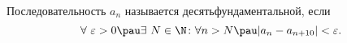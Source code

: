 Последовательность $a_n$ называется десятьфундаментальной, если 
\[\forall\ \varepsilon>0\pau\exists\ 
N\in \N\colon \forall n>N \pau  
|a_n-a_{n+10}|<\varepsilon.\]
 